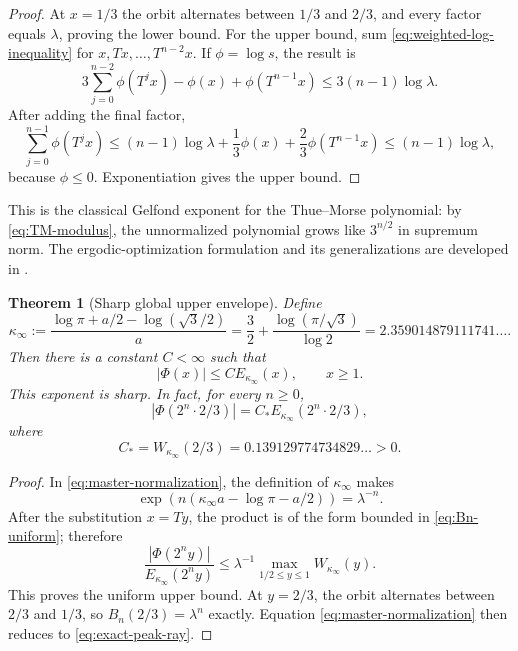 \documentclass[11pt,oneside]{article}
\newtheorem{theorem}{Theorem}[section]
\theoremstyle{definition}
\theoremstyle{remark}
\newcommand{\Phiup}{\Phi}
\newcommand{\abs}[1]{\left|#1\right|}
\begin{document}
\begin{proof}
At $x=1/3$ the orbit alternates between $1/3$ and $2/3$, and every factor equals
$\lambda$, proving the lower bound.  For the upper bound, sum
\eqref{eq:weighted-log-inequality} for $x,Tx,\dots,T^{n-2}x$.  If
$\phi=\log s$, the result is
\[
 3\sum_{j=0}^{n-2}\phi(T^jx)-\phi(x)+\phi(T^{n-1}x)
 \le3(n-1)\log\lambda.
\]
After adding the final factor,
\[
 \sum_{j=0}^{n-1}\phi(T^jx)
 \le(n-1)\log\lambda+\frac13\phi(x)+\frac23\phi(T^{n-1}x)
 \le(n-1)\log\lambda,
\]
because $\phi\le0$.  Exponentiation gives the upper bound.
\end{proof}

This is the classical Gelfond exponent for the Thue--Morse polynomial: by
\eqref{eq:TM-modulus}, the unnormalized polynomial grows like $3^{n/2}$ in supremum norm.
The ergodic-optimization formulation and its generalizations are developed in
\cite{fan-schmeling-shen}.

\begin{theorem}[Sharp global upper envelope]
\label{thm:uniform-envelope}
Define
\begin{equation}
 \boxed{\displaystyle
 \kappa_\infty
 :=\frac{\log\pi+a/2-\log(\sqrt3/2)}{a}
 =\frac32+\frac{\log(\pi/\sqrt3)}{\log2}
 =2.359014879111741\ldots .}
 \label{eq:kappa-infty}
\end{equation}
Then there is a constant $C<\infty$ such that
\begin{equation}
 \abs{\Phiup(x)}\le C E_{\kappa_\infty}(x),
 \qquad x\ge1.
 \label{eq:uniform-envelope}
\end{equation}
This exponent is sharp.  In fact, for every $n\ge0$,
\begin{equation}
 \abs{\Phiup(2^n\cdot2/3)}
 =C_*E_{\kappa_\infty}(2^n\cdot2/3),
 \label{eq:exact-peak-ray}
\end{equation}
where
\begin{equation}
 C_*=W_{\kappa_\infty}(2/3)
 =0.139129774734829\ldots>0.
 \label{eq:Cstar}
\end{equation}
\end{theorem}

\begin{proof}
In \eqref{eq:master-normalization}, the definition of $\kappa_\infty$ makes
\[
 \exp(n(\kappa_\infty a-\log\pi-a/2))=\lambda^{-n}.
\]
After the substitution $x=Ty$, the product is of the form bounded in
\eqref{eq:Bn-uniform}; therefore
\[
 \frac{\abs{\Phiup(2^ny)}}{E_{\kappa_\infty}(2^ny)}
 \le\lambda^{-1}\max_{1/2\le y\le1}W_{\kappa_\infty}(y).
\]
This proves the uniform upper bound.  At $y=2/3$, the orbit alternates between $2/3$ and
$1/3$, so $B_n(2/3)=\lambda^n$ exactly.  Equation
\eqref{eq:master-normalization} then reduces to \eqref{eq:exact-peak-ray}.
\end{proof}
\end{document}
